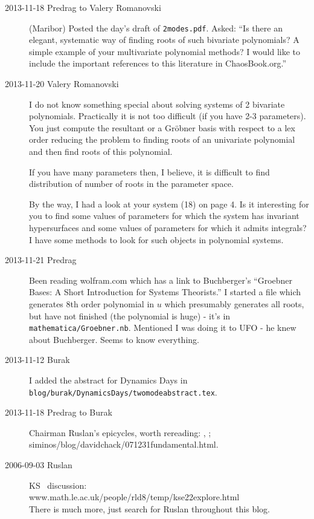 \begin{description}
\item[2013-11-18 Predrag to Valery Romanovski] (Maribor)
Posted the day's draft of \texttt{2modes.pdf}. Asked: ``Is there an
elegant, systematic way of finding roots of such bivariate polynomials? A
simple example of your multivariate polynomial methods? I would like to
include the important references to this literature in ChaosBook.org.''

\item[2013-11-20 Valery Romanovski]
I do not know something special about solving systems of 2 bivariate
polynomials. Practically it is not too difficult (if you have 2-3
parameters). You just compute the resultant or a Gr{\"o}bner basis with
respect to a lex order reducing the problem to finding roots of an
univariate polynomial and then find roots of  this polynomial.

If you have many parameters then, I believe, it is difficult to find
distribution of number of roots in the parameter space.

By the way, I had a look at your system (18) on page 4. Is it interesting
for you to find some values of parameters for which the system has
invariant hypersurfaces and some values of parameters for which  it
admits integrals? I have some methods to look for such objects in
polynomial systems.

\item[2013-11-21 Predrag] Been reading
 {wolfram.com}
which has a link to Buchberger's ``Groebner Bases: A Short Introduction
for Systems Theorists.'' I started a file which generates 8th order
polynomial in $u$ which presumably generates all roots, but have not
finished (the polynomial is huge) - it's in
\texttt{mathematica/Groebner.nb}. Mentioned I was doing it to UFO - he knew
about Buchberger. Seems to know everything.

\item[2013-11-12 Burak]
I added the abstract for Dynamics Days in
\\
\texttt{blog/burak/DynamicsDays/twomodeabstract.tex}.

\item[2013-11-18 Predrag to Burak] Chairman Ruslan's epicycles,
worth rereading:
, ;
{siminos/blog/davidchack/071231fundamental.html}.

\item[2006-09-03 Ruslan]
KS \eqva\ discussion:
\\
{www.math.le.ac.uk/people/rld8/temp/kse22explore.html}
\\
There is much more, just search for Ruslan throughout this blog.


\end{description}
